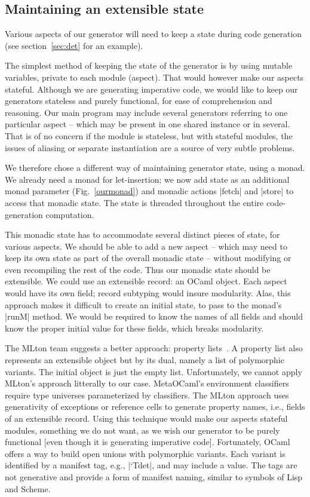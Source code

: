 \documentclass{elsart}
\begin{document}
\subsection{Maintaining an extensible state}

Various aspects of our generator will need to keep a state during
code generation (see section~\ref{sec:det} for an example).

The simplest method of keeping the state of the generator is by using
mutable variables, private to each module (aspect). That would however make our
aspects stateful. Although we are generating imperative code, we would like to
keep our generators stateless and purely functional, for ease of comprehension
and reasoning.  Our main
program may include several generators referring to one particular
aspect -- which may be present in one shared instance or in
several. That is of no concern if the module is
stateless, but with stateful modules, the issues of aliasing or separate
instantiation are a source of very subtle problems.

We therefore chose a different way of maintaining generator state,
using a monad. We already need a monad for let-insertion; we now add state as
an additional monad parameter (Fig.~\ref{ourmonad}) and monadic
actions |fetch| and |store| to access that monadic state. The state is
threaded throughout the entire code-generation computation. 

This monadic state has to accommodate several distinct pieces of state, for
various aspects. We should be able to add a new aspect -- which may need
to keep its own state as part of the overall monadic state -- without
modifying or even recompiling the rest of the code. Thus our monadic
state should be extensible. We could use an extensible
record: an OCaml object. Each aspect would have its own field; record
subtyping would insure modularity. Alas, this approach makes it
difficult to create an initial state, to pass to the monad's |runM|
method. We would be required to know the names of all fields and should know
the proper initial value for these fields, which breaks modularity.

The MLton team suggests a better approach: property 
lists~\cite{mlton-proplist}.  A property list also represents an
extensible object but by its dual, namely a list of polymorphic variants.  The
initial object is just the empty list.  Unfortunately, we cannot apply
MLton's approach litterally to our case.  MetaOCaml's environment classifiers
require type universes parameterized by classifiers. The MLton
approach uses generativity of exceptions or reference cells to
generate property names, i.e., fields of an extensible record. Using this
technique would make our aspects stateful modules, something we do not
want, as we wish our generator to be purely functional [even though it is
generating imperative code].
Fortunately, OCaml offers a way to build open unions with
polymorphic variants. Each variant is identified by a manifest tag,
e.g., |`Tdet|, and may include a value. The tags are not generative and
provide a form of manifest naming, similar to symbols of
Lisp and Scheme.
\end{document}
